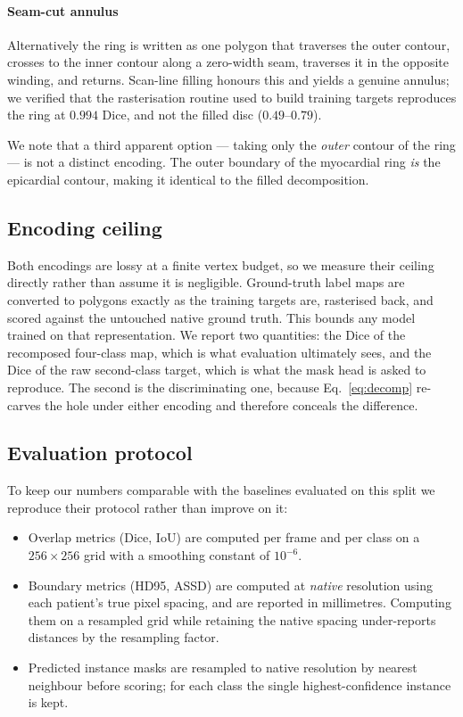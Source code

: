 \paragraph{Seam-cut annulus} Alternatively the ring is written as one polygon
that traverses the outer contour, crosses to the inner contour along a
zero-width seam, traverses it in the opposite winding, and returns. Scan-line
filling honours this and yields a genuine annulus; we verified that the
rasterisation routine used to build training targets reproduces the ring at
$0.994$ Dice, and not the filled disc ($0.49$--$0.79$).

We note that a third apparent option --- taking only the \emph{outer} contour of
the ring --- is not a distinct encoding. The outer boundary of the myocardial
ring \emph{is} the epicardial contour, making it identical to the filled
decomposition.

\subsection{Encoding ceiling}
\label{sec:ceiling}

Both encodings are lossy at a finite vertex budget, so we measure their ceiling
directly rather than assume it is negligible. Ground-truth label maps are
converted to polygons exactly as the training targets are, rasterised back, and
scored against the untouched native ground truth. This bounds any model trained
on that representation. We report two quantities: the Dice of the recomposed
four-class map, which is what evaluation ultimately sees, and the Dice of the
raw second-class target, which is what the mask head is asked to reproduce. The
second is the discriminating one, because Eq.~\ref{eq:decomp} re-carves the hole
under either encoding and therefore conceals the difference.

\subsection{Evaluation protocol}
\label{sec:protocol}

To keep our numbers comparable with the baselines evaluated on this split we
reproduce their protocol rather than improve on it:

\begin{itemize}
\item Overlap metrics (Dice, IoU) are computed per frame and per class on a
      $256\times256$ grid with a smoothing constant of $10^{-6}$.
\item Boundary metrics (HD95, ASSD) are computed at \emph{native} resolution
      using each patient's true pixel spacing, and are reported in millimetres.
      Computing them on a resampled grid while retaining the native spacing
      under-reports distances by the resampling factor.
\item Predicted instance masks are resampled to native resolution by nearest
      neighbour before scoring; for each class the single highest-confidence
      instance is kept.
\end{itemize}

